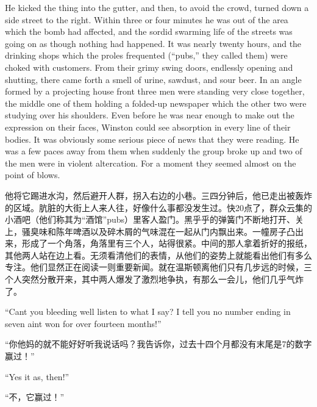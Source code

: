 \begin{paracol}{2}
\switchcolumn*

He kicked the thing into the gutter, and then, to avoid the crowd,
turned down a side street to the right. Within three or four minutes he
was out of the area which the bomb had affected, and the sordid swarming
life of the streets was going on as though nothing had happened. It was
nearly twenty hours, and the drinking shops which the proles frequented
(``pubs,'' they called them) were choked with customers. From their grimy
swing doors, endlessly opening and shutting, there came forth a smell of
urine, sawdust, and sour beer. In an angle formed by a projecting house
front three men were standing very close together, the middle one of
them holding a folded-up newspaper which the other two were studying
over his shoulders. Even before he was near enough to make out the
expression on their faces, Winston could see absorption in every line of
their bodies. It was obviously some serious piece of news that they were
reading. He was a few paces away from them when suddenly the group broke
up and two of the men were in violent altercation. For a moment they
seemed almost on the point of blows.

\switchcolumn

他将它踢进水沟，然后避开人群，拐入右边的小巷。三四分钟后，他已走出被轰炸的区域。肮脏的大街上人来人往，好像什么事都没发生过。快20点了，群众云集的小酒吧（他们称其为``酒馆''pubs）里客人盈门。黑乎乎的弹簧门不断地打开、关上，骚臭味和陈年啤酒以及碎木屑的气味混在一起从门内飘出来。一幢房子凸出来，形成了一个角落，角落里有三个人，站得很紧。中间的那人拿着折好的报纸，其他两人站在边上看。无须看清他们的表情，从他们的姿势上就能看出他们有多么专注。他们显然正在阅读一则重要新闻。就在温斯顿离他们只有几步远的时候，三个人突然分散开来，其中两人爆发了激烈地争执，有那么一会儿，他们几乎气炸了。

\switchcolumn*

``Can\textquotesingle t you bleeding well listen to what I say? I tell
you no number ending in seven ain\textquotesingle t won for over
fourteen months!''

\switchcolumn

``你他妈的就不能好好听我说话吗？我告诉你，过去十四个月都没有末尾是7的数字赢过！''

\switchcolumn*

``Yes it \textquotesingle as, then!''

\switchcolumn

``不，它赢过！''

\switchcolumn*


\end{paracol}
